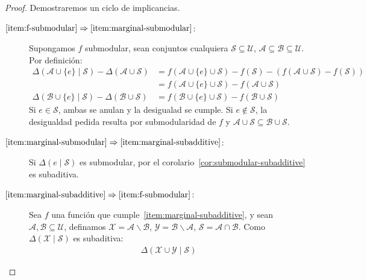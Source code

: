   \begin{proof}
    Demostraremos un ciclo de implicancias.
    \begin{description}
    \item[\boldmath\(
            \ref{item:f-submodular}
              \Rightarrow \ref{item:marginal-submodular}
          \)\unboldmath:]
      Supongamos \(f\) submodular,
      sean conjuntos cualquiera \(\mathscr{S} \subseteq \mathscr{U}\),
      \(\mathscr{A} \subseteq \mathscr{B} \subseteq \mathscr{U}\).
      Por definición:
      \begin{align*}
        \Delta(\mathscr{A} \cup \{e\} \mid \mathscr{S})
          - \Delta(\mathscr{A} \cup \mathscr{S})
          &= f(\mathscr{A} \cup \{e\} \cup \mathscr{S})
                 - f(\mathscr{S})
               -(f(\mathscr{A} \cup \mathscr{S})
                 - f(\mathscr{S})) \\
          &= f(\mathscr{A} \cup \{e\} \cup \mathscr{S})
               - f(\mathscr{A} \cup \mathscr{S}) \\
        \Delta(\mathscr{B} \cup \{e\} \mid \mathscr{S})
          - \Delta(\mathscr{B} \cup \mathscr{S})
          &= f(\mathscr{B} \cup \{e\} \cup \mathscr{S})
               - f(\mathscr{B} \cup \mathscr{S})
      \end{align*}
      Si \(e \in \mathscr{S}\),
      ambas se anulan y la desigualad se cumple.
      Si \(e \notin \mathscr{S}\),
      la desigualdad pedida resulta por submodularidad de \(f\)
      y \(\mathscr{A} \cup \mathscr{S}
            \subseteq \mathscr{B} \cup \mathscr{S}\).
    \item[\boldmath\(
            \ref{item:marginal-submodular}
               \Rightarrow \ref{item:marginal-subadditive}
          \)\unboldmath:]
      Si \(\Delta(e \mid \mathscr{S})\) es submodular,
      por el corolario~\ref{cor:submodular-subadditive} es subaditiva.
    \item[\boldmath\(
            \ref{item:marginal-subadditive}
              \Rightarrow \ref{item:f-submodular}
          \)\unboldmath:]
      Sea \(f\) una función que cumple~\ref{item:marginal-subadditive},
      y sean \(\mathscr{A}, \mathscr{B} \subseteq \mathscr{U}\),
      definamos
        \(\mathscr{X} = \mathscr{A} \smallsetminus \mathscr{B}\),
        \(\mathscr{Y} = \mathscr{B} \smallsetminus \mathscr{A}\),
        \(\mathscr{S} = \mathscr{A} \cap \mathscr{B}\).
      Como \(\Delta(\mathscr{X} \mid \mathscr{S})\)
      es subaditiva:
      \begin{align*}
        \Delta(\mathscr{X} \cup \mathscr{Y} \mid \mathscr{S})

\end{align*}
\end{description}
\end{proof}
